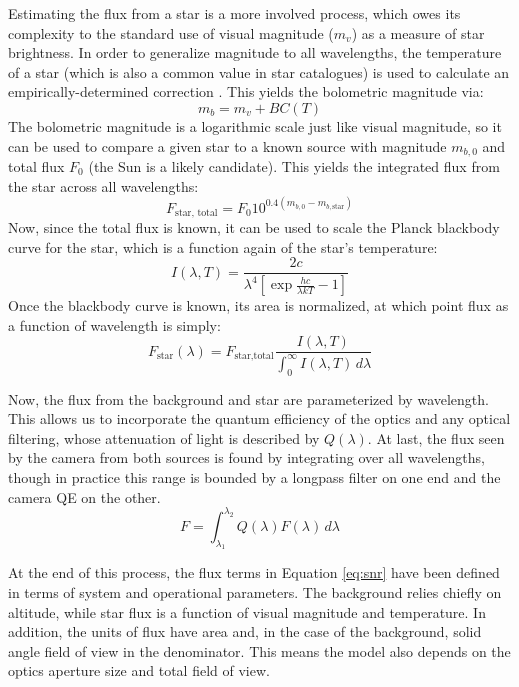\documentclass[twocolumn,letterpaper]{IEEEAerospace2012}
\newcommand{\parens} [1] {\left(  #1  \right)}
\newcommand{\brackets} [1] {\left[ #1 \right]}
\newcommand{\BC}{\mathit{BC}}
\newcommand{\sub}[1]{\text{#1}} %
\begin{document}
Estimating the flux from a star is a more involved process, which owes its complexity to the standard use of visual magnitude ($m_v$) as a measure of star brightness. In order to generalize magnitude to all wavelengths, the temperature of a star (which is also a common value in star catalogues) is used to calculate an empirically-determined correction \cite{bolometric}. This yields the bolometric magnitude via:
\begin{equation}
    \label{eq:bolometric}
    m_b = m_v + \BC (T)
\end{equation}
The bolometric magnitude is a logarithmic scale just like visual magnitude, so it can be used to compare a given star to a known source with magnitude $m_{b,0}$ and total flux $F_0$ (the Sun is a likely candidate). This yields the integrated flux from the star across all wavelengths:
\begin{equation}
    \label{eq:totalflux}
    F_{\sub{star, total}} = F_0 10^{0.4 \parens{m_{b,0} - m_{b,\sub{star}}}}
\end{equation}
Now, since the total flux is known, it can be used to scale the Planck blackbody curve for the star, which is a function again of the star's temperature:
\begin{equation}
    \label{eq:planck}
    I(\lambda, T) = \frac{2c}{\lambda^4 \brackets{\exp{\frac{hc}{\lambda k T}} - 1}}
\end{equation}
Once the blackbody curve is known, its area is normalized, at which point flux as a function of wavelength is simply:
\begin{equation}
    \label{eq:flux}
    F_{\sub{star}}(\lambda) = F_{\sub{star,total}}\frac{I(\lambda,T)}{\int_0^\infty I(\lambda,T) \, d\lambda}
\end{equation}

Now, the flux from the background and star are parameterized by wavelength. This allows us to incorporate the quantum efficiency of the optics and any optical filtering, whose attenuation of light is described by $Q(\lambda)$. At last, the flux seen by the camera from both sources is found by integrating over all wavelengths, though in practice this range is bounded by a longpass filter on one end and the camera QE on the other.
\begin{equation}
    \label{eq:totalfluxes}
    F = \int_{\lambda_1}^{\lambda_2} Q(\lambda) F(\lambda) \, d\lambda
\end{equation}

At the end of this process, the flux terms in Equation \ref{eq:snr} have been defined in terms of system and operational parameters. The background relies chiefly on altitude, while star flux is a function of visual magnitude and temperature. In addition, the units of flux have area and, in the case of the background, solid angle field of view in the denominator. This means the model also depends on the optics aperture size and total field of view.
\end{document}
